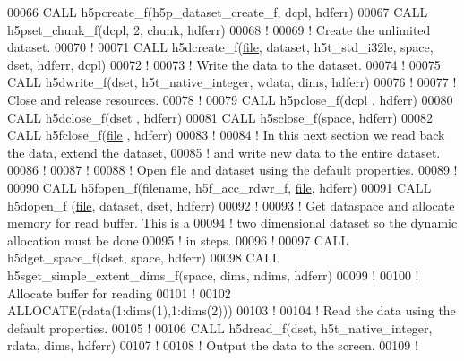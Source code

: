 \begin{DoxyCode}
00066   \textcolor{keyword}{CALL }h5pcreate\_f(h5p\_dataset\_create\_f, dcpl, hdferr)
00067   \textcolor{keyword}{CALL }h5pset\_chunk\_f(dcpl, 2, chunk, hdferr)
00068   \textcolor{comment}{!}
00069   \textcolor{comment}{! Create the unlimited dataset.}
00070   \textcolor{comment}{!}
00071   \textcolor{keyword}{CALL }h5dcreate\_f(\hyperlink{structfile}{file}, dataset, h5t\_std\_i32le, space, dset, hdferr, dcpl)
00072   \textcolor{comment}{!}
00073   \textcolor{comment}{! Write the data to the dataset.}
00074   \textcolor{comment}{!}
00075   \textcolor{keyword}{CALL }h5dwrite\_f(dset, h5t\_native\_integer, wdata, dims, hdferr)
00076   \textcolor{comment}{!}
00077   \textcolor{comment}{! Close and release resources.}
00078   \textcolor{comment}{!}
00079   \textcolor{keyword}{CALL }h5pclose\_f(dcpl , hdferr)
00080   \textcolor{keyword}{CALL }h5dclose\_f(dset , hdferr)
00081   \textcolor{keyword}{CALL }h5sclose\_f(space, hdferr)
00082   \textcolor{keyword}{CALL }h5fclose\_f(\hyperlink{structfile}{file} , hdferr)
00083   \textcolor{comment}{!}
00084   \textcolor{comment}{! In this next section we read back the data, extend the dataset,}
00085   \textcolor{comment}{! and write new data to the entire dataset.}
00086   \textcolor{comment}{!}
00087   \textcolor{comment}{!}
00088   \textcolor{comment}{! Open file and dataset using the default properties.}
00089   \textcolor{comment}{!}
00090   \textcolor{keyword}{CALL }h5fopen\_f(filename, h5f\_acc\_rdwr\_f, \hyperlink{structfile}{file}, hdferr)
00091   \textcolor{keyword}{CALL }h5dopen\_f (\hyperlink{structfile}{file}, dataset, dset, hdferr)
00092   \textcolor{comment}{!}
00093   \textcolor{comment}{! Get dataspace and allocate memory for read buffer.  This is a}
00094   \textcolor{comment}{! two dimensional dataset so the dynamic allocation must be done}
00095   \textcolor{comment}{! in steps.}
00096   \textcolor{comment}{!}
00097   \textcolor{keyword}{CALL }h5dget\_space\_f(dset, space, hdferr)
00098   \textcolor{keyword}{CALL }h5sget\_simple\_extent\_dims\_f(space, dims, ndims, hdferr)
00099   \textcolor{comment}{!}
00100   \textcolor{comment}{! Allocate buffer for reading}
00101   \textcolor{comment}{!}
00102   \textcolor{keyword}{ALLOCATE}(rdata(1:dims(1),1:dims(2)))
00103   \textcolor{comment}{!}
00104   \textcolor{comment}{! Read the data using the default properties.}
00105   \textcolor{comment}{!}
00106   \textcolor{keyword}{CALL }h5dread\_f(dset, h5t\_native\_integer, rdata, dims, hdferr)
00107   \textcolor{comment}{!}
00108   \textcolor{comment}{! Output the data to the screen.}
00109   \textcolor{comment}{!}

\end{DoxyCode}
